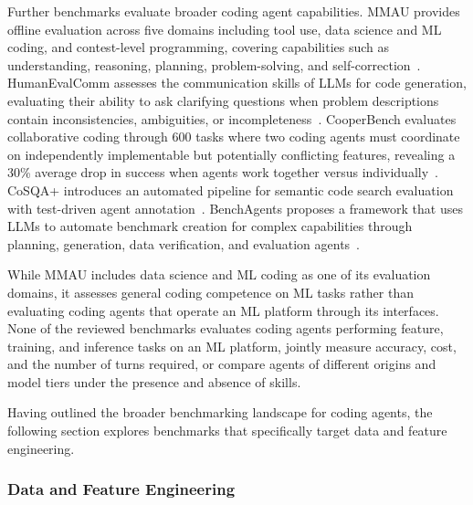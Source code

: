 \documentclass[
english,                 %
bibtex,                  %
]{kththesis}
\numberwithin{listing}{chapter}
\begin{document}
Further benchmarks evaluate broader coding agent capabilities. \gls{MMAU} provides offline evaluation across five domains including tool use, data science and \gls{ML} coding, and contest-level programming, covering capabilities such as understanding, reasoning, planning, problem-solving, and self-correction~\cite{yin_mmau_2025}. \Gls{HumanEvalComm} assesses the communication skills of \glspl{LLM} for code generation, evaluating their ability to ask clarifying questions when problem descriptions contain inconsistencies, ambiguities, or incompleteness~\cite{wu_humanevalcomm_2025}. CooperBench evaluates collaborative coding through 600 tasks where two coding agents must coordinate on independently implementable but potentially conflicting features, revealing a 30\% average drop in success when agents work together versus individually~\cite{khatua_cooperbench_2026}. \gls{CoSQA}+ introduces an automated pipeline for semantic code search evaluation with test-driven agent annotation~\cite{gong_cosqa_2026}. \Gls{Bench}Agents proposes a framework that uses \glspl{LLM} to automate benchmark creation for complex capabilities through planning, generation, data verification, and evaluation agents~\cite{butt_benchagents_2025}.

While \gls{MMAU} includes data science and \gls{ML} coding as one of its evaluation domains, it assesses general coding competence on \gls{ML} tasks rather than evaluating coding agents that operate an \gls{ML} platform through its interfaces. None of the reviewed benchmarks evaluates coding agents performing feature, training, and inference tasks on an \gls{ML} platform, jointly measure accuracy, cost, and the number of turns required, or compare agents of different origins and model tiers under the presence and absence of skills.

Having outlined the broader benchmarking landscape for coding agents, the following section explores benchmarks that specifically target data and feature engineering.

\subsubsection{Data and Feature Engineering}
\label{sec:bg_data_and_feature_engineering}
\end{document}
